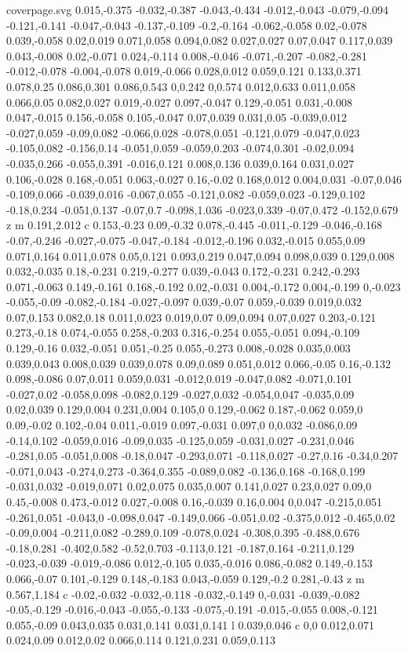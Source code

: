 \begin{filecontents}[noheader]{coverpage.svg}
0.015,-0.375 -0.032,-0.387 -0.043,-0.434 -0.012,-0.043 -0.079,-0.094 -0.121,-0.141 -0.047,-0.043 -0.137,-0.109 -0.2,-0.164 -0.062,-0.058 0.02,-0.078 0.039,-0.058 0.02,0.019 0.071,0.058 0.094,0.082 0.027,0.027 0.07,0.047 0.117,0.039 0.043,-0.008 0.02,-0.071 0.024,-0.114 0.008,-0.046 -0.071,-0.207 -0.082,-0.281 -0.012,-0.078 -0.004,-0.078 0.019,-0.066 0.028,0.012 0.059,0.121 0.133,0.371 0.078,0.25 0.086,0.301 0.086,0.543 0,0.242 0,0.574 0.012,0.633 0.011,0.058 0.066,0.05 0.082,0.027 0.019,-0.027 0.097,-0.047 0.129,-0.051 0.031,-0.008 0.047,-0.015 0.156,-0.058 0.105,-0.047 0.07,0.039 0.031,0.05 -0.039,0.012 -0.027,0.059 -0.09,0.082 -0.066,0.028 -0.078,0.051 -0.121,0.079 -0.047,0.023 -0.105,0.082 -0.156,0.14 -0.051,0.059 -0.059,0.203 -0.074,0.301 -0.02,0.094 -0.035,0.266 -0.055,0.391 -0.016,0.121 0.008,0.136 0.039,0.164 0.031,0.027 0.106,-0.028 0.168,-0.051 0.063,-0.027 0.16,-0.02 0.168,0.012 0.004,0.031 -0.07,0.046 -0.109,0.066 -0.039,0.016 -0.067,0.055 -0.121,0.082 -0.059,0.023 -0.129,0.102 -0.18,0.234 -0.051,0.137 -0.07,0.7 -0.098,1.036 -0.023,0.339 -0.07,0.472 -0.152,0.679 z m 0.191,2.012 c 0.153,-0.23 0.09,-0.32 0.078,-0.445 -0.011,-0.129 -0.046,-0.168 -0.07,-0.246 -0.027,-0.075 -0.047,-0.184 -0.012,-0.196 0.032,-0.015 0.055,0.09 0.071,0.164 0.011,0.078 0.05,0.121 0.093,0.219 0.047,0.094 0.098,0.039 0.129,0.008 0.032,-0.035 0.18,-0.231 0.219,-0.277 0.039,-0.043 0.172,-0.231 0.242,-0.293 0.071,-0.063 0.149,-0.161 0.168,-0.192 0.02,-0.031 0.004,-0.172 0.004,-0.199 0,-0.023 -0.055,-0.09 -0.082,-0.184 -0.027,-0.097 0.039,-0.07 0.059,-0.039 0.019,0.032 0.07,0.153 0.082,0.18 0.011,0.023 0.019,0.07 0.09,0.094 0.07,0.027 0.203,-0.121 0.273,-0.18 0.074,-0.055 0.258,-0.203 0.316,-0.254 0.055,-0.051 0.094,-0.109 0.129,-0.16 0.032,-0.051 0.051,-0.25 0.055,-0.273 0.008,-0.028 0.035,0.003 0.039,0.043 0.008,0.039 0.039,0.078 0.09,0.089 0.051,0.012 0.066,-0.05 0.16,-0.132 0.098,-0.086 0.07,0.011 0.059,0.031 -0.012,0.019 -0.047,0.082 -0.071,0.101 -0.027,0.02 -0.058,0.098 -0.082,0.129 -0.027,0.032 -0.054,0.047 -0.035,0.09 0.02,0.039 0.129,0.004 0.231,0.004 0.105,0 0.129,-0.062 0.187,-0.062 0.059,0 0.09,-0.02 0.102,-0.04 0.011,-0.019 0.097,-0.031 0.097,0 0,0.032 -0.086,0.09 -0.14,0.102 -0.059,0.016 -0.09,0.035 -0.125,0.059 -0.031,0.027 -0.231,0.046 -0.281,0.05 -0.051,0.008 -0.18,0.047 -0.293,0.071 -0.118,0.027 -0.27,0.16 -0.34,0.207 -0.071,0.043 -0.274,0.273 -0.364,0.355 -0.089,0.082 -0.136,0.168 -0.168,0.199 -0.031,0.032 -0.019,0.071 0.02,0.075 0.035,0.007 0.141,0.027 0.23,0.027 0.09,0 0.45,-0.008 0.473,-0.012 0.027,-0.008 0.16,-0.039 0.16,0.004 0,0.047 -0.215,0.051 -0.261,0.051 -0.043,0 -0.098,0.047 -0.149,0.066 -0.051,0.02 -0.375,0.012 -0.465,0.02 -0.09,0.004 -0.211,0.082 -0.289,0.109 -0.078,0.024 -0.308,0.395 -0.488,0.676 -0.18,0.281 -0.402,0.582 -0.52,0.703 -0.113,0.121 -0.187,0.164 -0.211,0.129 -0.023,-0.039 -0.019,-0.086 0.012,-0.105 0.035,-0.016 0.086,-0.082 0.149,-0.153 0.066,-0.07 0.101,-0.129 0.148,-0.183 0.043,-0.059 0.129,-0.2 0.281,-0.43 z m 0.567,1.184 c -0.02,-0.032 -0.032,-0.118 -0.032,-0.149 0,-0.031 -0.039,-0.082 -0.05,-0.129 -0.016,-0.043 -0.055,-0.133 -0.075,-0.191 -0.015,-0.055 0.008,-0.121 0.055,-0.09 0.043,0.035 0.031,0.141 0.031,0.141 l 0.039,0.046 c 0,0 0.012,0.071 0.024,0.09 0.012,0.02 0.066,0.114 0.121,0.231 0.059,0.113 
\end{filecontents}
